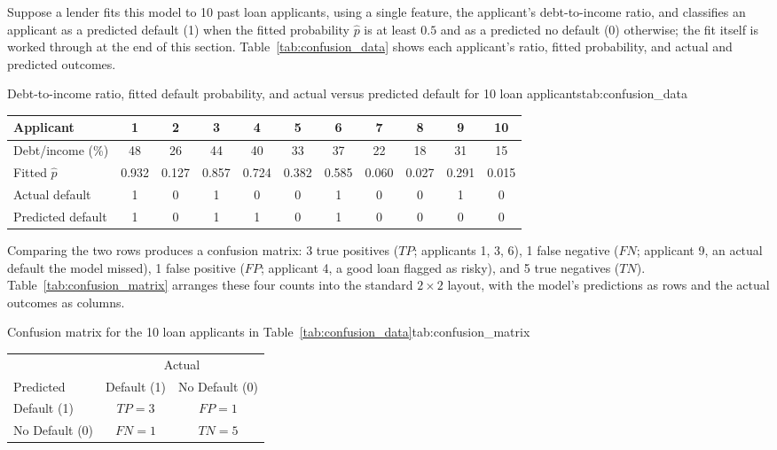 \documentclass[../ai_in_finance]{subfiles}
\begin{document}
Suppose a lender fits this model to 10 past loan applicants, using a single feature, the applicant's debt-to-income ratio, and classifies an applicant as a predicted default (1) when the fitted probability $\hat p$ is at least $0.5$ and as a predicted no default (0) otherwise; the fit itself is worked through at the end of this section. Table~\ref{tab:confusion_data} shows each applicant's ratio, fitted probability, and actual and predicted outcomes.

\begin{booktable}[htbp]{Debt-to-income ratio, fitted default probability, and actual versus predicted default for 10 loan applicants}{tab:confusion_data}
\begin{tabular}{lcccccccccc}
\toprule
Applicant & 1 & 2 & 3 & 4 & 5 & 6 & 7 & 8 & 9 & 10 \\
\midrule
Debt/income (\%)  & 48 & 26 & 44 & 40 & 33 & 37 & 22 & 18 & 31 & 15 \\
Fitted $\hat p$   & 0.932 & 0.127 & 0.857 & 0.724 & 0.382 & 0.585 & 0.060 & 0.027 & 0.291 & 0.015 \\
Actual default    & 1 & 0 & 1 & 0 & 0 & 1 & 0 & 0 & 1 & 0 \\
Predicted default & 1 & 0 & 1 & 1 & 0 & 1 & 0 & 0 & 0 & 0 \\
\bottomrule
\end{tabular}
\end{booktable}

Comparing the two rows produces a confusion matrix: 3 true positives ($TP$; applicants 1, 3, 6), 1 false negative ($FN$; applicant 9, an actual default the model missed), 1 false positive ($FP$; applicant 4, a good loan flagged as risky), and 5 true negatives ($TN$). Table~\ref{tab:confusion_matrix} arranges these four counts into the standard $2\times 2$ layout, with the model's predictions as rows and the actual outcomes as columns.

\begin{booktable}[htbp]{Confusion matrix for the 10 loan applicants in Table~\ref{tab:confusion_data}}{tab:confusion_matrix}
\begin{tabular}{lcc}
\toprule
 & \multicolumn{2}{c}{Actual} \\
\cmidrule(l){2-3}
Predicted & Default (1) & No Default (0) \\
\midrule
Default (1) & $TP=3$ & $FP=1$ \\
No Default (0) & $FN=1$ & $TN=5$ \\
\bottomrule
\end{tabular}
\end{booktable}
\end{document}
